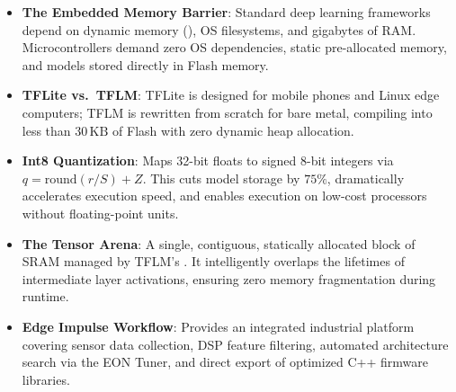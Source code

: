 \begin{takeaways}
\begin{itemize}
    \item \textbf{The Embedded Memory Barrier}: Standard deep learning frameworks depend on dynamic memory (), OS filesystems, and gigabytes of RAM. Microcontrollers demand zero OS dependencies, static pre-allocated memory, and models stored directly in Flash memory.
    \item \textbf{TFLite vs.\ TFLM}: TFLite is designed for mobile phones and Linux edge computers; TFLM is rewritten from scratch for bare metal, compiling into less than $30\,\text{KB}$ of Flash with zero dynamic heap allocation.
    \item \textbf{Int8 Quantization}: Maps 32-bit floats to signed 8-bit integers via $q = \text{round}(r / S) + Z$. This cuts model storage by $75\%$, dramatically accelerates execution speed, and enables execution on low-cost processors without floating-point units.
    \item \textbf{The Tensor Arena}: A single, contiguous, statically allocated block of SRAM managed by TFLM's . It intelligently overlaps the lifetimes of intermediate layer activations, ensuring zero memory fragmentation during runtime.
    \item \textbf{Edge Impulse Workflow}: Provides an integrated industrial platform covering sensor data collection, DSP feature filtering, automated architecture search via the EON Tuner, and direct export of optimized C++ firmware libraries.
\end{itemize}
\end{takeaways}

